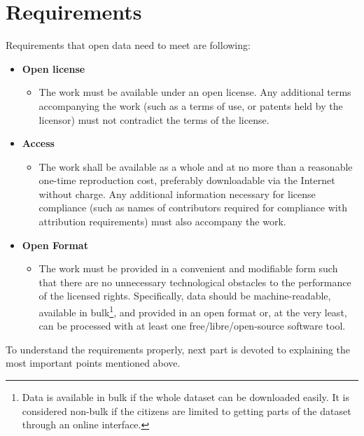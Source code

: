 \documentclass[thesis=B,english]{FITthesis}[2012/06/26]
\begin{document}
	\section{Requirements}
	Requirements that open data need to meet are following:\cite{opendefinition}
	\renewcommand\labelitemii{}
	\begin{itemize}
	 	\item \textbf{Open license}
			\begin{itemize}
				\item The work must be available under an open license. Any additional terms accompanying the work (such as a terms of use, or patents held by the licensor) must not contradict the terms of the license.
		\end{itemize}
  		\item \textbf{Access}
  			\begin{itemize}
  				\item The work shall be available as a whole and at no more than a reasonable one-time reproduction cost, preferably downloadable via the Internet without charge. Any additional information necessary for license compliance (such as names of contributors required for compliance with attribution requirements) must also accompany the work.
  			\end{itemize}
  			\item \textbf{Open Format}
  			\begin{itemize}
  				\item The work must be provided in a convenient and modifiable form such that there are no unnecessary technological obstacles to the performance of the licensed rights. Specifically, data should be machine-readable, available in bulk\footnote{Data is available in bulk if the whole dataset can be downloaded easily. It is considered non-bulk if the citizens are limited to getting parts of the dataset through an online interface.}, and provided in an open format or, at the very least, can be processed with at least one free/libre/open-source software tool.
  			\end{itemize}
	\end{itemize}

To understand the requirements properly, next part is devoted to explaining the most important points mentioned above.
\end{document}
